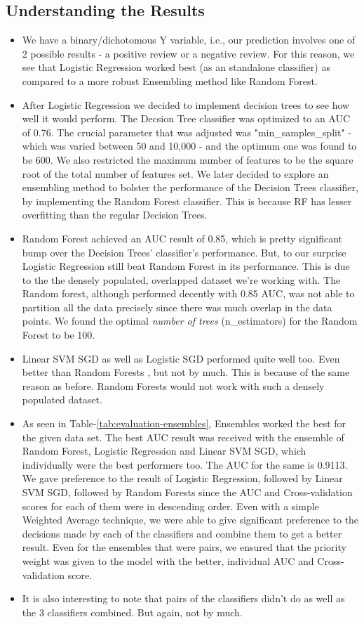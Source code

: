 \subsection{Understanding the Results}

\begin{itemize}
    \item
    We have a binary/dichotomous Y variable, i.e., our prediction involves one of 2 possible results - a positive review or a negative review. For this reason, we see that Logistic Regression worked best (as an standalone classifier) as compared to a more robust Ensembling method like Random Forest.
    \item 
    After Logistic Regression we decided to implement decision trees to see how well it would perform. The Decsion Tree classifier was optimized to an AUC of 0.76. The crucial parameter that was adjusted was "min\_samples\_split" - which was varied between 50 and 10,000 - and the optimum one was found to be 600. We also restricted the maximum number of features to be the square root of the total number of features set.
    We later decided to explore an ensembling method to bolster the performance of the Decision Trees classifier, by implementing the Random Forest classifier. This is because RF has lesser overfitting than the regular Decision Trees.
    \item
    Random Forest achieved an AUC result of 0.85, which is pretty significant bump over the Decision Trees' classifier's performance. But, to our surprise Logistic Regression still beat Random Forest in its performance. This is due to the the densely populated, overlapped dataset we're working with. The Random forest, although performed decently with 0.85 AUC, was not able to partition all the data precisely since there was much overlap in the data points. We found the optimal \textit{number of trees} (n\_estimators) for the Random Forest to be 100.
    \item
    Linear SVM SGD as well as Logistic SGD performed quite well too. Even better than Random Forests , but not by much. This is because of the same reason as before. Random Forests would not work with such a densely populated dataset.
    \item As seen in Table-\ref{tab:evaluation-ensembles}, Ensembles worked the best for the given data set. The best AUC result was received with the ensemble of Random Forest, Logistic Regression and Linear SVM SGD, which individually were the best performers too. The AUC for the same is 0.9113. We gave preference to the result of Logistic Regression, followed by Linear SVM SGD, followed by Random Forests since the AUC and Cross-validation scores for each of them were in descending order. Even with a simple Weighted Average technique, we were able to give significant preference to the decisions made by each of the classifiers and combine them to get a better result. Even for the ensembles that were pairs, we ensured that the priority weight was given to the model with the better, individual AUC and Cross-validation score.
    \item It is also interesting to note that pairs of the classifiers didn't do as well as the 3 classifiers combined. But again, not by much.
\end{itemize}